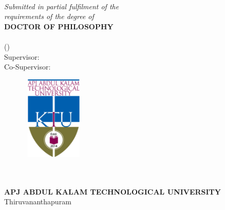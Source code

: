 \thispagestyle{empty}
\graphicspath{{Figures/PNG/}{Figures/}}
\doublespacing
\begin{center}
\vspace{12mm}
{\fontsize{17pt}{20pt}\textbf{\thetitle}} \\
\vspace{8mm}
\textit{Submitted in partial fulfilment of the \\ requirements of the degree of} \\
\vspace{8mm}
\large
{\fontsize{14pt}{18pt} \textbf{DOCTOR OF PHILOSOPHY}} \\
\vspace{5mm}
\fontsize{14pt}{18pt} \thescholar \vspace{-0.2cm}\\ (\theregnumber)\\

Supervisor: \thesupervisor\\ 
\vspace{-.2cm}
Co-Supervisor: \thecosupervisor\\ 

\vspace{3cm}
\begin{figure}[h!]
\centering

\includegraphics[height=4cm,width=3cm]{Figures/ktu_logo.png}
\end{figure}
\vspace{2mm}
{\fontsize{14}{18} \thedepartment\\

\thecollege\\
 \textbf{APJ ABDUL KALAM TECHNOLOGICAL UNIVERSITY}\\

Thiruvananthapuram \\
\theyear}

\end{center}
\thispagestyle{empty}
\onehalfspacing